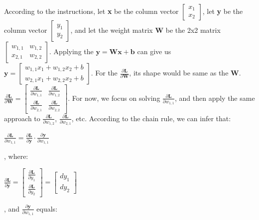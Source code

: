 \documentclass[12pt]{article}
\begin{document}
According to the instructions, let \textbf{x} be the column vector
$\left[
\begin{matrix}
x_{1}\\
x_{2}
\end{matrix}
\right]$, let \textbf{y} be the column vector
$\left[
\begin{matrix}
y_{1}\\
y_{2}
\end{matrix}
\right]$, and let the weight matrix \textbf{W} be the 2x2 matrix
$\left[
\begin{matrix}
w_{1,1} & w_{1,2}\\
x_{2,1} & w_{2,2}
\end{matrix}
\right]$. Applying the $\textbf{y} = \textbf{W}\textbf{x} + \textbf{b}$ can give us $\textbf{y} = 
\left[\begin{matrix}
w_{1,1}x_{1}+w_{1,2}x_{2}+b\\
w_{2,1}x_{1}+w_{2,2}x_{2}+b
\end{matrix}\right]$. For the $\frac{\partial\textbf{L}}{\partial\textbf{W}}$, its shape would be same as the \textbf{W}. $\frac{\partial\textbf{L}}{\partial\textbf{W}} = 
\left[\begin{matrix}
\frac{\partial\textbf{L}}{\partial w_{1,1}} & \frac{\partial\textbf{L}}{\partial w_{1,2}}\\
\frac{\partial\textbf{L}}{\partial w_{2,1}} & \frac{\partial\textbf{L}}{\partial w_{2,2}}
\end{matrix}\right]$. For now, we focus on solving $\frac{\partial\textbf{L}}{\partial w_{1,1}}$, and then apply the same approach to $\frac{\partial\textbf{L}}{\partial w_{1,2}}$, $\frac{\partial\textbf{L}}{\partial w_{2,1}}$, etc.
\newline\indent According to the chain rule, we can infer that:
\begin{center}
    $\frac{\partial\textbf{L}}{\partial w_{1,1}} = \frac{\partial\textbf{L}}{\partial \textbf{y}}\cdot\frac{\partial\textbf{y}}{\partial w_{1,1}}$
\end{center}, where:
\begin{center}
    $
    \frac{\partial\textbf{L}}{\partial \textbf{y}} = 
    \left[\begin{matrix}
    \frac{\partial\textbf{L}}{\partial y_{1}}\\
    \frac{\partial\textbf{L}}{\partial y_{2}}
    \end{matrix}\right] = 
    \left[\begin{matrix}
    dy_{1}\\
    dy_{2}
    \end{matrix}\right]$
\end{center}, and $\frac{\partial\textbf{y}}{\partial w_{1,1}}$ equals:
\end{document}
